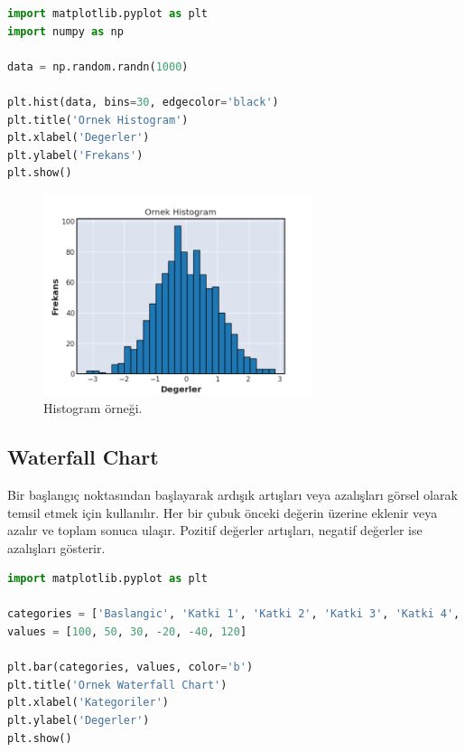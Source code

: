 \begin{lstlisting}[language=Python]
import matplotlib.pyplot as plt
import numpy as np

data = np.random.randn(1000)

plt.hist(data, bins=30, edgecolor='black')
plt.title('Ornek Histogram')
plt.xlabel('Degerler')
plt.ylabel('Frekans')
plt.show()
\end{lstlisting}

\begin{figure}[h]
    \centering
    \includegraphics[width=0.7\textwidth]{images/histogram.png}
    \caption{Histogram örneği.}
    \label{fig:enter-label}
\end{figure}

\newpage

\subsection{Waterfall Chart}
Bir başlangıç noktasından başlayarak ardışık artışları veya azalışları görsel olarak temsil etmek için kullanılır. Her bir çubuk önceki değerin üzerine eklenir veya azalır ve toplam sonuca ulaşır. Pozitif değerler artışları, negatif değerler ise azalışları gösterir.

\begin{lstlisting}[language=Python]
import matplotlib.pyplot as plt

categories = ['Baslangic', 'Katki 1', 'Katki 2', 'Katki 3', 'Katki 4', 'Toplam']
values = [100, 50, 30, -20, -40, 120]

plt.bar(categories, values, color='b')
plt.title('Ornek Waterfall Chart')
plt.xlabel('Kategoriler')
plt.ylabel('Degerler')
plt.show()  
\end{lstlisting}

